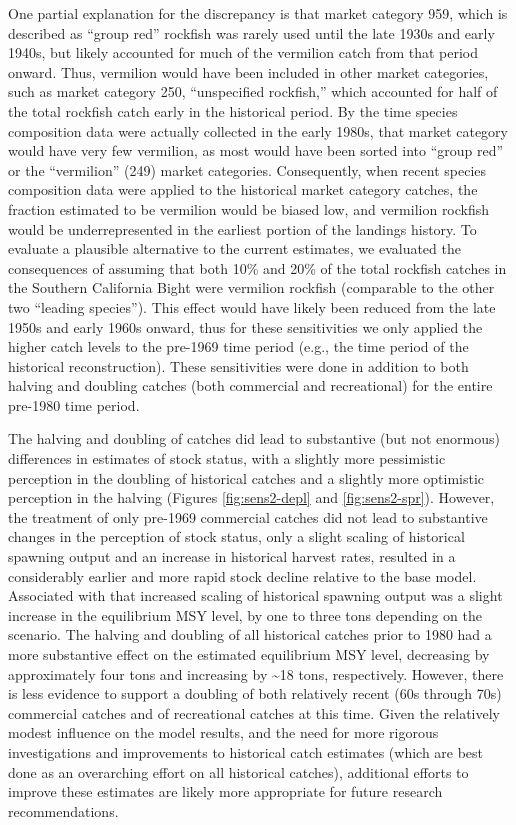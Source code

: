 \documentclass[
  english,
  a4paper,
]{article}
\begin{document}
One partial explanation for the discrepancy is that market category 959, which is described as ``group red'' rockfish was rarely used until the late 1930s and early 1940s, but likely accounted for much of the vermilion catch from that period onward. Thus, vermilion would have been included in other market categories, such as market category 250, ``unspecified rockfish,'' which accounted for half of the total rockfish catch early in the historical period. By the time species composition data were actually collected in the early 1980s, that market category would have very few vermilion, as most would have been sorted into ``group red'' or the ``vermilion'' (249) market categories. Consequently, when recent species composition data were applied to the historical market category catches, the fraction estimated to be vermilion would be biased low, and vermilion rockfish would be underrepresented in the earliest portion of the landings history. To evaluate a plausible alternative to the current estimates, we evaluated the consequences of assuming that both 10\% and 20\% of the total rockfish catches in the Southern California Bight were vermilion rockfish (comparable to the other two ``leading species''). This effect would have likely been reduced from the late 1950s and early 1960s onward, thus for these sensitivities we only applied the higher catch levels to the pre-1969 time period (e.g., the time period of the historical reconstruction). These sensitivities were done in addition to both halving and doubling catches (both commercial and recreational) for the entire pre-1980 time period.

The halving and doubling of catches did lead to substantive (but not enormous) differences in estimates of stock status, with a slightly more pessimistic perception in the doubling of historical catches and a slightly more optimistic perception in the halving (Figures \ref{fig:sens2-depl} and \ref{fig:sens2-spr}). However, the treatment of only pre-1969 commercial catches did not lead to substantive changes in the perception of stock status, only a slight scaling of historical spawning output and an increase in historical harvest rates, resulted in a considerably earlier and more rapid stock decline relative to the base model. Associated with that increased scaling of historical spawning output was a slight increase in the equilibrium MSY level, by one to three tons depending on the scenario. The halving and doubling of all historical catches prior to 1980 had a more substantive effect on the estimated equilibrium MSY level, decreasing by approximately four tons and increasing by \textasciitilde18 tons, respectively. However, there is less evidence to support a doubling of both relatively recent (60s through 70s) commercial catches and of recreational catches at this time. Given the relatively modest influence on the model results, and the need for more rigorous investigations and improvements to historical catch estimates (which are best done as an overarching effort on all historical catches), additional efforts to improve these estimates are likely more appropriate for future research recommendations.
\end{document}
